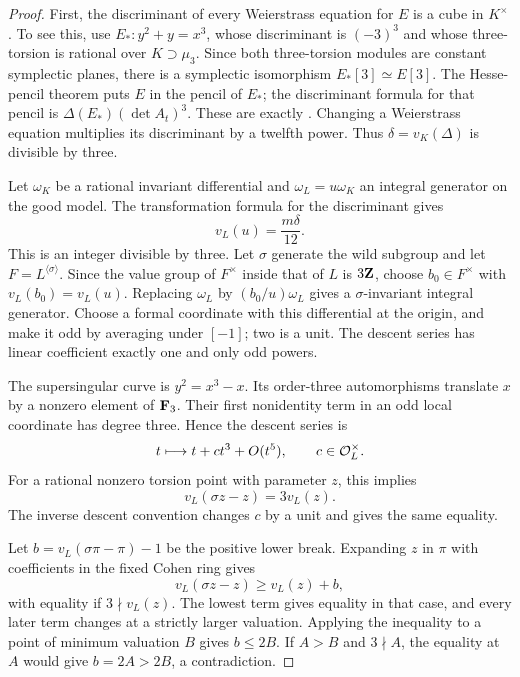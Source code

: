 \begin{proof}
First, the discriminant of every Weierstrass equation for $E$ is a cube in $K^\times$. To see this, use $E_*:y^2+y=x^3$, whose discriminant is $(-3)^3$ and whose three-torsion is rational over $K\supset\mu_3$. Since both three-torsion modules are constant symplectic planes, there is a symplectic isomorphism $E_*[3]\simeq E[3]$. The Hesse-pencil theorem puts $E$ in the pencil of $E_*$; the discriminant formula for that pencil is $\Delta(E_*)(\det A_t)^3$. These are exactly \citet[Theorem~1.1 and Proposition~5.1]{AnemaTopTuijp2018}. Changing a Weierstrass equation multiplies its discriminant by a twelfth power. Thus $\delta=v_K(\Delta)$ is divisible by three.

Let $\omega_K$ be a rational invariant differential and $\omega_L=u\omega_K$ an integral generator on the good model. The transformation formula for the discriminant gives
\[
 v_L(u)=\frac{m\delta}{12}.
\]
This is an integer divisible by three. Let $\sigma$ generate the wild subgroup and let $F=L^{\langle\sigma\rangle}$. Since the value group of $F^\times$ inside that of $L$ is $3\mathbf Z$, choose $b_0\in F^\times$ with $v_L(b_0)=v_L(u)$. Replacing $\omega_L$ by $(b_0/u)\omega_L$ gives a $\sigma$-invariant integral generator. Choose a formal coordinate with this differential at the origin, and make it odd by averaging under $[-1]$; two is a unit. The descent series has linear coefficient exactly one and only odd powers.

The supersingular curve is $y^2=x^3-x$. Its order-three automorphisms translate $x$ by a nonzero element of $\mathbf F_3$. Their first nonidentity term in an odd local coordinate has degree three. Hence the descent series is
\[
 t\longmapsto t+c t^3+O(t^5),\qquad c\in\mathcal O_L^\times.
\]
For a rational nonzero torsion point with parameter $z$, this implies
\begin{equation}\label{eq:wild-point-displacement}
 v_L(\sigma z-z)=3v_L(z).
\end{equation}
The inverse descent convention changes $c$ by a unit and gives the same equality.

Let $b=v_L(\sigma\pi-\pi)-1$ be the positive lower break. Expanding $z$ in $\pi$ with coefficients in the fixed Cohen ring gives
\begin{equation}\label{eq:uniformizer-displacement}
 v_L(\sigma z-z)\ge v_L(z)+b,
\end{equation}
with equality if $3\nmid v_L(z)$. The lowest term gives equality in that case, and every later term changes at a strictly larger valuation. Applying the inequality to a point of minimum valuation $B$ gives $b\le2B$. If $A>B$ and $3\nmid A$, the equality at $A$ would give $b=2A>2B$, a contradiction.


\end{proof}
